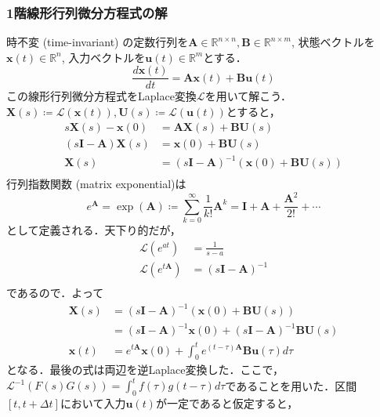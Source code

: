 \subsubsection{1階線形行列微分方程式の解}
時不変 (time-invariant) の定数行列を$\mathbf{A} \in \mathbb{R}^{n\times n}, \mathbf{B} \in \mathbb{R}^{n\times m}$, 状態ベクトルを$\mathbf{x}(t)\in\mathbb{R}^n$, 入力ベクトルを$\mathbf{u}(t)\in\mathbb{R}^m$とする．
\begin{equation}
\frac{d\mathbf{x}(t)}{dt} = \mathbf{A}\mathbf{x}(t) + \mathbf{B}\mathbf{u}(t)
\end{equation}
この線形行列微分方程式をLaplace変換$\mathscr{L}$を用いて解こう．$\boldsymbol{X}(s) \coloneqq \mathscr{L}(\mathbf{x}(t)), \boldsymbol{U}(s) \coloneqq \mathscr{L}(\mathbf{u}(t))$とすると，
\begin{align}
s\boldsymbol{X}(s) - \mathbf{x}(0) &= \mathbf{A}\boldsymbol{X}(s)+ \mathbf{B}\boldsymbol{U}(s)\\
(s\mathbf{I} - \mathbf{A}) \boldsymbol{X}(s) &= \mathbf{x}(0) + \mathbf{B}\boldsymbol{U}(s)\\
\boldsymbol{X}(s) &= (s\mathbf{I} - \mathbf{A})^{-1}(\mathbf{x}(0) + \mathbf{B}\boldsymbol{U}(s))\\
\end{align}
行列指数関数 (matrix exponential)は
\begin{equation}
e^\mathbf{A} = \exp(\mathbf{A}) \coloneqq \sum_{k=0}^\infty \frac{1}{k!}\mathbf{A}^k = \mathbf{I}+\mathbf{A}+\frac{\mathbf{A}^2}{2!}+\cdots
\end{equation}
として定義される．天下り的だが，
\begin{align}
\mathscr{L}(e^{at})&=\frac{1}{s-a}\\
\mathscr{L}(e^{t\mathbf{A}})&=(s\mathbf{I} - \mathbf{A})^{-1}\\
\end{align}
であるので．よって
\begin{align}
\boldsymbol{X}(s) &= (s\mathbf{I} - \mathbf{A})^{-1}(\mathbf{x}(0) + \mathbf{B}\boldsymbol{U}(s))\\
&= (s\mathbf{I} - \mathbf{A})^{-1}\mathbf{x}(0) + (s\mathbf{I} - \mathbf{A})^{-1}\mathbf{B}\boldsymbol{U}(s)\\
\mathbf{x}(t)&=e^{t\mathbf{A}}\mathbf{x}(0)+\int_0^t e^{(t-\tau)\mathbf{A}}\mathbf{B}\mathbf{u}(\tau) d\tau
\end{align}
となる．最後の式は両辺を逆Laplace変換した．ここで，$\mathscr{L}^{-1}(F(s)G(s))=\int_0^tf(\tau)g(t-\tau)d\tau$であることを用いた．区間$[t, t+\Delta t]$において入力$\mathbf{u}(t)$が一定であると仮定すると，
